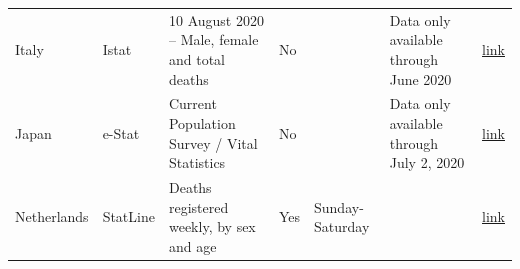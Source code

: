\documentclass[
]{article}
\begin{document}
\begin{landscape}
\begin{table}[]
\begin{tabular}{p{.5in}p{1.5in}p{2in}p{1in}p{1.5in}p{1in}p{.5in}}
Italy            & Istat                                                                                                                                                                & 10 August 2020 – Male, female and total deaths                                                                                                                             & No                &                                                          & Data only available through June 2020                                    & \href{https://www.istat.it/en/archivio/240106}{link}                                                                                                                                                                                                                                                                                       \\
Japan            & e-Stat                                                                                                                                                               & Current Population Survey / Vital   Statistics                                                                                                                             & No                &                                                          & Data only available through July 2, 2020                                 & \href{https://www.e-stat.go.jp/stat-search/files?page=1\&layout=dataset\&toukei=00450011\&tstat=000001028897\&cycle=1\&tclass1=000001053058\&tclass2=000001053059\&metadata=1\&data=1}{link}                                                                                                                                               \\
Netherlands      & StatLine                                                                                                                                                             & Deaths registered weekly, by sex and age                                                                                                                                   & Yes               & Sunday-Saturday                                          &                                                                          & \href{https://opendata.cbs.nl/statline/portal.html?_la=en&_catalog=CBS&tableId=70895ENG&_theme=1079}{link}                                                                                                                                                                                                                                            \\

\end{tabular}
\end{table}
\end{landscape}
\end{document}
